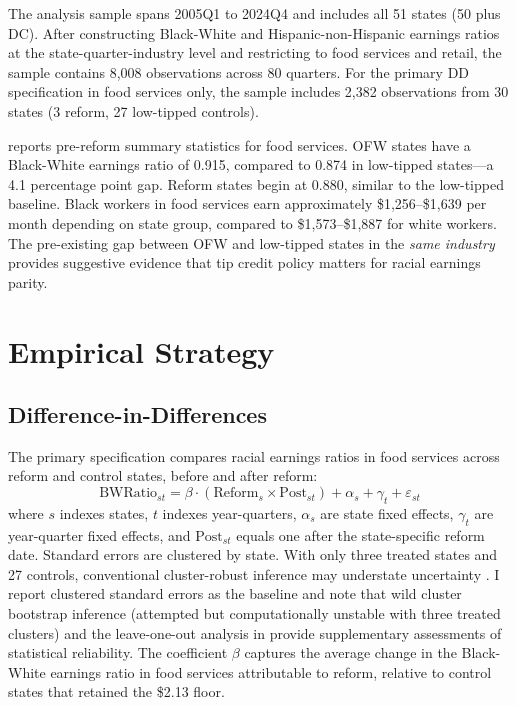 \documentclass[12pt]{article}
\begin{document}
The analysis sample spans 2005Q1 to 2024Q4 and includes all 51 states (50 plus DC). After constructing Black-White and Hispanic-non-Hispanic earnings ratios at the state-quarter-industry level and restricting to food services and retail, the sample contains 8,008 observations across 80 quarters. For the primary DD specification in food services only, the sample includes 2,382 observations from 30 states (3 reform, 27 low-tipped controls).



 reports pre-reform summary statistics for food services. OFW states have a Black-White earnings ratio of 0.915, compared to 0.874 in low-tipped states---a 4.1 percentage point gap. Reform states begin at 0.880, similar to the low-tipped baseline. Black workers in food services earn approximately \$1,256--\$1,639 per month depending on state group, compared to \$1,573--\$1,887 for white workers. The pre-existing gap between OFW and low-tipped states in the \textit{same industry} provides suggestive evidence that tip credit policy matters for racial earnings parity.

\section{Empirical Strategy}

\subsection{Difference-in-Differences}

The primary specification compares racial earnings ratios in food services across reform and control states, before and after reform:
\begin{equation}
\text{BWRatio}_{st} = \beta \cdot (\text{Reform}_s \times \text{Post}_{st}) + \alpha_s + \gamma_t + \varepsilon_{st}
\label{eq:dd}
\end{equation}
where $s$ indexes states, $t$ indexes year-quarters, $\alpha_s$ are state fixed effects, $\gamma_t$ are year-quarter fixed effects, and $\text{Post}_{st}$ equals one after the state-specific reform date. Standard errors are clustered by state. With only three treated states and 27 controls, conventional cluster-robust inference may understate uncertainty \citep{conley2011inference}. I report clustered standard errors as the baseline and note that wild cluster bootstrap inference (attempted but computationally unstable with three treated clusters) and the leave-one-out analysis in  provide supplementary assessments of statistical reliability. The coefficient $\beta$ captures the average change in the Black-White earnings ratio in food services attributable to reform, relative to control states that retained the \$2.13 floor.
\end{document}
